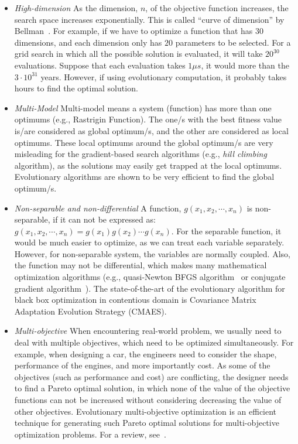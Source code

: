 \begin{itemize}

\item \textit{High-dimension} As the dimension, $n$, of the objective function increases, the search space increases exponentially. This is called ``curve of dimension'' by Bellman~\cite{Bellman1957}. For example, if we have to optimize a function that has $30$ dimensions, and each dimension only has $20$ parameters to be selected. For a grid search in which all the possible solution is evaluated, it will take $20^{30}$ evaluations. Suppose that each evaluation takes $1\mu s$, it would more than the $3\cdot 10^{31}$ years. However, if using evolutionary computation, it probably takes hours to find the optimal solution. 

\item \textit{Multi-Model} Multi-model means a system (function) has more than one optimums (e.g., Rastrigin Function). The one/s with the best fitness value is/are considered as global optimum/s, and the other are considered as local optimums. 
These local optimums around the global optimum/s are very misleading for the gradient-based search algorithms (e.g., \textit{hill climbing} algorithm), as the solutions may easily get trapped at the local optimums. Evolutionary algorithms are shown to be very efficient to find the global optimum/s. %

\item \textit{Non-separable and non-differential} A function, $g(x_1, x_2, \cdots, x_n)$ is non-separable, if it can not be expressed as: $g(x_1, x_2, \cdots, x_n) = g(x_1)g(x_2) \cdots g(x_n)$. For the separable function, it would be much easier to optimize, as we can treat each variable separately. However, for non-separable system, the variables are normally coupled. Also, the function may not be differential, which makes many mathematical optimization algorithms (e.g., quasi-Newton BFGS algorithm~\cite{Dennis1977} or conjugate gradient algorithm~\cite{Shewchuk1994}). The state-of-the-art of the evolutionary algorithm for black box optimization in contentious domain is Covariance Matrix Adaptation Evolution Strategy (CMAES)\cite{Hansen2003}.

\item \textit{Multi-objective} When encountering real-world problem, we usually need to deal with multiple objectives, which need to be optimized simultaneously. For example, when designing a car, the engineers need to consider the shape, performance of the engines, and more importantly cost. As some of the objectives (such as performance and cost) are conflicting, the designer needs to find a Pareto optimal solution, in which none of the value of the objective functions can not be increased without considering decreasing the value of other objectives. Evolutionary multi-objective optimization is an efficient technique for generating such Pareto optimal solutions for multi-objective optimization problems. For a review, see~\cite{Fonseca1995}. 


\end{itemize}
